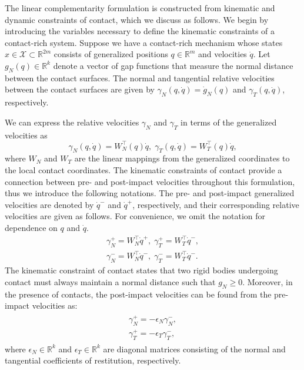 The linear complementarity formulation is constructed from kinematic and dynamic
constraints of contact, which we discuss as follows.
%
We begin by introducing the variables necessary to define the kinematic
constraints of a contact-rich system.
%
Suppose we have a contact-rich mechanism whose states $x \in \mathcal{X} \subset
\mathbb{R}^{2m}$ consists of generalized positions $q \in \mathbb{R}^m$ and
velocities $\dot{q}$.
%
Let $g_N(q) \in \mathbb{R}^{k}$ denote a vector of gap functions that measure
the normal distance between the contact surfaces. 
%
The normal and tangential relative velocities between the contact surfaces are
given by $\gamma_N(q, \dot{q}) = \dot{g}_N(q)$ and $\gamma_T(q, \dot{q})$,
respectively.
%

We can express the relative velocities $\gamma_N$ and $\gamma_T$ in terms of the
generalized velocities as 
%
\begin{equation}
  \gamma_N(q, \dot{q}) = W_N^\top(q) \dot{q}, \; \gamma_T(q, \dot{q}) = W_T^\top(q) \dot{q},
  \label{eq:gamma}
\end{equation} 
% 
\noindent where $W_N$ and $W_T$ are the linear mappings from the generalized
coordinates to the local contact coordinates.
%
The kinematic constraints of contact provide a connection between pre- and
post-impact velocities throughout this formulation, thus we introduce the
following notations.
%
The pre- and post-impact generalized velocities are denoted by $\dot{q}^-$ and
$\dot{q}^+$, respectively, and their corresponding relative velocities are given
as follows. For convenience, we omit the notation for dependence on $q$ and
$\dot{q}$.
\begin{align*}
  \gamma_N^+ = W_N^\top \dot{q}^+, \; \gamma_T^+ = W_T^\top \dot{q}^-, \\
  \gamma_N^- = W_N^\top \dot{q}^-, \; \gamma_T^- = W_T^\top \dot{q}^-.
\end{align*}
%
The kinematic constraint of contact states that two rigid bodies undergoing
contact must always maintain a normal distance such that $g_N \geq 0$. Moreover,
in the presence of contacts, the post-impact velocities can be found from the
pre-impact velocities as:
\begin{align}
  \begin{gathered}
    \gamma_N^+ = -\epsilon_N \gamma_N^-, \\
    \gamma_T^+ = -\epsilon_T \gamma_T^-,
  \end{gathered}
  \label{eq:postimpactVel}
\end{align}
\noindent where $\epsilon_N \in \mathbb{R}^k$ and $\epsilon_T \in \mathbb{R}^k$
are diagonal matrices consisting of the normal and tangential coefficients of
restitution, respectively.

